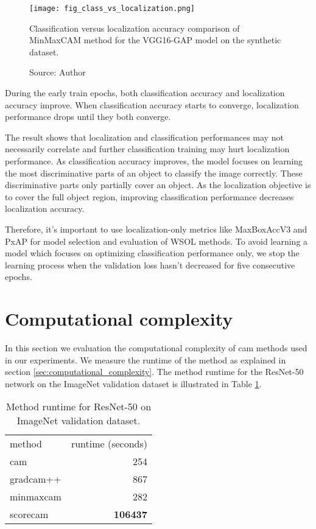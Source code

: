 \begin{figure}[ht]
    \begin{center}       
    \texttt{[image: fig\_class\_vs\_localization.png]}
    \caption[Classification versus localization accuracy]{Classification versus localization accuracy comparison of MinMaxCAM method for the VGG16-GAP model on the synthetic dataset.}
    \caption*{Source: Author}
    \label{fig:classification_versus_localization}
    \end{center}
\end{figure}

During the early train epochs, both classification accuracy and localization accuracy improve. When classification accuracy starts to converge, localization performance drops until they both converge.

The result shows that localization and classification performances may not necessarily correlate and further classification training may hurt localization performance. As classification accuracy improves, the model focuses on learning the most discriminative parts of an object to classify the image correctly. These discriminative parts only partially cover an object. As the localization objective is to cover the full object region, improving classification performance decreases localization accuracy. 

Therefore, it's important to use localization-only metrics like MaxBoxAccV3 and PxAP for model selection and evaluation of WSOL methods. To avoid learning a model which focuses on optimizing classification performance only, we stop the learning process when the validation loss hasn't decreased for five consecutive epochs.

\section{Computational complexity}
In this section we evaluation the computational complexity of \acrshort{cam} methods used in our experiments. We measure the runtime of the method as explained in section \ref{sec:computational_complexity}. The method runtime for the ResNet-50 network on the ImageNet validation dataset is illustrated in Table \ref{tab:runtime_resnet50_imagenet}.

\begin{table}[ht]
\centering
\begin{tabular}{lr}
\toprule
method & runtime (seconds) \\
\cmidrule(lr){1-1} \cmidrule(lr){2-2}
cam & 254 \\
gradcam++ & 867\\
minmaxcam & 282 \\
scorecam & \bfseries 106437 \\
\bottomrule
\end{tabular}
\caption[Method runtime for ResNet-50 on ImageNet validation dataset]{Method runtime for ResNet-50 on ImageNet validation dataset.}
\label{tab:runtime_resnet50_imagenet}
\end{table}

